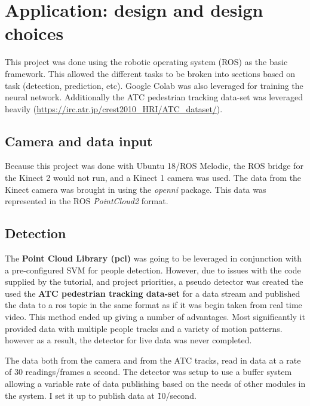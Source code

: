\documentclass[10pt,a4paper]{article}
\begin{document}
\section{Application: design and design choices}
This project was done using the robotic operating system (ROS) as the basic framework. This allowed the different tasks to be broken into sections based on task (detection, prediction, etc). Google Colab was also leveraged for training the neural network. Additionally the ATC pedestrian tracking data-set was leveraged heavily (\url{https://irc.atr.jp/crest2010_HRI/ATC_dataset/}).

\subsection{Camera and data input}
Because this project was done with Ubuntu 18/ROS Melodic, the ROS bridge for the Kinect 2 would not run, and a Kinect 1 camera was used. The data from the Kinect camera was brought in using the \textit{openni} package. This data was represented in the ROS \textit{PointCloud2} format.

\subsection{Detection}
The \textbf{Point Cloud Library (pcl)} was going to be leveraged in conjunction with a pre-configured SVM for people detection. However, due to issues with the code supplied by the tutorial, and project priorities, a pseudo detector was created the used the \textbf{ATC pedestrian tracking data-set} for a data stream and published the data to a ros topic in the same format as if it was begin taken from real time video. This method ended up giving a number of advantages. Most significantly it provided data with multiple people tracks and a variety of motion patterns. however as a  result, the detector for live data was never completed.

The data both from the camera and from the ATC tracks, read in data at a rate of 30 readings/frames a second. The detector was setup to use a buffer system allowing a variable rate of data publishing based on the needs of other modules in the system. I set it up to publish data at \~10/second.
\end{document}
